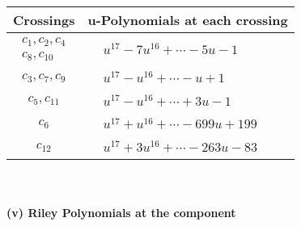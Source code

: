 \documentclass[1p]{elsarticle_modified}
\theoremstyle{definition}
\begin{document}
\begin{tabular}{m{50pt}|m{274pt}}
Crossings & \hspace{64pt}u-Polynomials at each crossing \\
\hline $$\begin{aligned}c_{1},c_{2},c_{4}\\c_{8},c_{10}\end{aligned}$$&$\begin{aligned}
&u^{17}-7 u^{16}+\cdots-5 u-1
\end{aligned}$\\
\hline $$\begin{aligned}c_{3},c_{7},c_{9}\end{aligned}$$&$\begin{aligned}
&u^{17}- u^{16}+\cdots- u+1
\end{aligned}$\\
\hline $$\begin{aligned}c_{5},c_{11}\end{aligned}$$&$\begin{aligned}
&u^{17}- u^{16}+\cdots+3 u-1
\end{aligned}$\\
\hline $$\begin{aligned}c_{6}\end{aligned}$$&$\begin{aligned}
&u^{17}+u^{16}+\cdots-699 u+199
\end{aligned}$\\
\hline $$\begin{aligned}c_{12}\end{aligned}$$&$\begin{aligned}
&u^{17}+3 u^{16}+\cdots-263 u-83
\end{aligned}$\\
\hline
\end{tabular}\\~\\
\newpage\renewcommand{\arraystretch}{1}
\flushleft \textbf{(v) Riley Polynomials at the component}\newline \\
\end{document}
